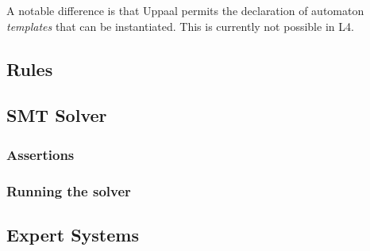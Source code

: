 A notable difference is that Uppaal permits the declaration of automaton
\emph{templates} that can be instantiated. This is currently not possible in L4.


\subsection{Rules}\label{sec:rules}


\subsection{SMT Solver}\label{sec:smt_solver}


\subsubsection{Assertions}\label{sec:assertions}


\subsubsection{Running the solver}\label{sec:running_solver}



\subsection{Expert Systems}\label{sec:epert_systems}





